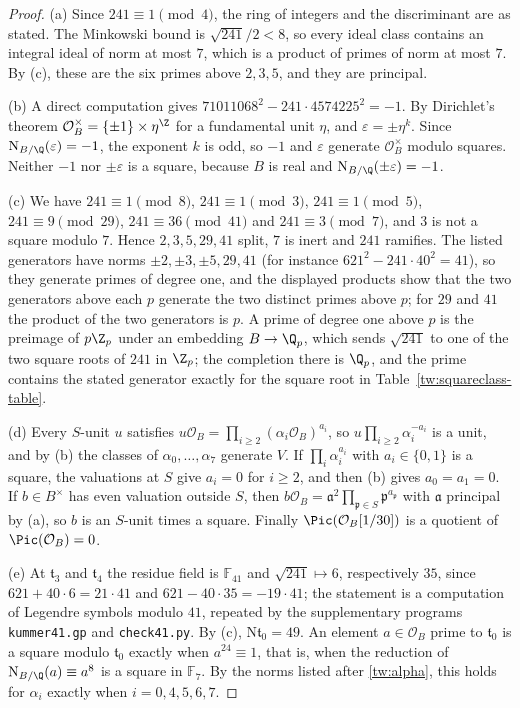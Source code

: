 \begin{proof}
(a) Since $241\equiv1\pmod 4$, the ring of integers and the discriminant are
as stated. The Minkowski bound is $\sqrt{241}/2<8$, so every ideal class
contains an integral ideal of norm at most $7$, which is a product of primes
of norm at most $7$. By (c), these are the six primes above $2,3,5$, and they
are principal.

(b) A direct computation gives $71011068^2-241\cdot4574225^2=-1$. By
Dirichlet's theorem $\mathcal O_B^\times=\{\pm1\}\times\eta^{\Z}$ for a
fundamental unit $\eta$, and $\varepsilon=\pm\eta^k$. Since
$\mathrm N_{B/\Q}(\varepsilon)=-1$, the exponent $k$ is odd, so $-1$ and
$\varepsilon$ generate $\mathcal O_B^\times$ modulo squares. Neither $-1$ nor
$\pm\varepsilon$ is a square, because $B$ is real and
$\mathrm N_{B/\Q}(\pm\varepsilon)=-1$.

(c) We have $241\equiv1\pmod8$, $241\equiv1\pmod3$, $241\equiv1\pmod5$,
$241\equiv9\pmod{29}$, $241\equiv36\pmod{41}$ and $241\equiv3\pmod7$, and $3$
is not a square modulo $7$. Hence $2,3,5,29,41$ split, $7$ is inert and $241$
ramifies. The listed generators have norms $\pm2,\pm3,\pm5,29,41$ (for
instance $621^2-241\cdot40^2=41$), so they generate primes of degree one, and
the displayed products show that the two generators above each $p$ generate
the two distinct primes above $p$; for $29$ and $41$ the product of the two
generators is $p$. A prime of degree one above $p$ is the preimage of
$p\Z_p$ under an embedding $B\to\Q_p$, which sends $\sqrt{241}$ to one of
the two square roots of $241$ in $\Z_p$; the completion there is $\Q_p$, and
the prime contains the stated generator exactly for the square root in
Table~\ref{tw:squareclass-table}.

(d) Every $S$-unit $u$ satisfies
$u\mathcal O_B=\prod_{i\ge2}(\alpha_i\mathcal O_B)^{a_i}$, so
$u\prod_{i\ge2}\alpha_i^{-a_i}$ is a unit, and by (b) the classes of
$\alpha_0,\dots,\alpha_7$ generate $V$. If $\prod_i\alpha_i^{a_i}$ with
$a_i\in\{0,1\}$ is a square, the valuations at $S$ give $a_i=0$ for $i\ge2$,
and then (b) gives $a_0=a_1=0$. If $b\in B^\times$ has even valuation outside
$S$, then
$b\mathcal O_B=\mathfrak a^2\prod_{\mathfrak p\in S}\mathfrak p^{a_{\mathfrak p}}$
with $\mathfrak a$ principal by (a), so $b$ is an $S$-unit times a square.
Finally $\Pic(\mathcal O_B[1/30])$ is a quotient of $\Pic(\mathcal O_B)=0$.

(e) At $\mathfrak t_3$ and $\mathfrak t_4$ the residue field is $\mathbb F_{41}$
and $\sqrt{241}\mapsto6$, respectively $35$, since $621+40\cdot6=21\cdot41$
and $621-40\cdot35=-19\cdot41$; the statement is a computation of Legendre
symbols modulo $41$, repeated by the supplementary programs
\texttt{kummer41.gp} and \texttt{check41.py}. By (c), $\mathrm N\mathfrak t_0=49$. An
element $a\in\mathcal O_B$ prime to
$\mathfrak t_0$ is a square modulo $\mathfrak t_0$ exactly when
$a^{24}\equiv1$, that is, when the reduction of $\mathrm N_{B/\Q}(a)\equiv a^8$ is a
square in $\mathbb F_7$. By the norms listed after \eqref{tw:alpha}, this
holds for $\alpha_i$ exactly when $i=0,4,5,6,7$.
\end{proof}

